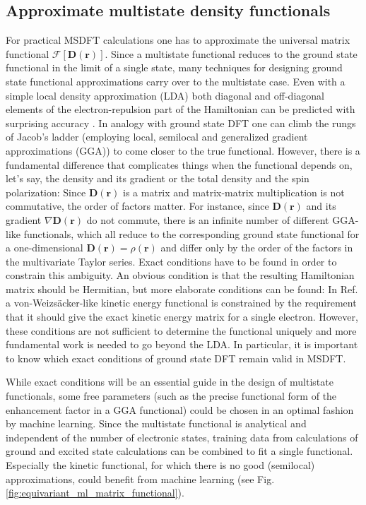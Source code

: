 \documentclass[12pt]{article}
\newcommand\m[1]{\mathbf{#1}}
\renewcommand\vec[1]{\mathbf{#1}}
\begin{document}
\subsection{Approximate multistate density functionals \label{sec:approximation}}
For practical MSDFT calculations one has to approximate the universal matrix functional $\m{\mathcal{F}}[\m{D}(\vec{r})]$.
Since a multistate functional reduces to the ground state functional in the limit of a single state,
many techniques for designing ground state functional approximations carry over to the multistate case.
Even with a simple local density approximation (LDA) both diagonal and off-diagonal elements of the electron-repulsion part of the Hamiltonian
can be predicted with surprising accuracy \cite{Humeniuk2024}. 
In analogy with ground state DFT one can climb the rungs of Jacob's ladder (employing local, semilocal and generalized gradient approximations (GGA))
to come closer to the true functional. However, there is a fundamental difference that complicates things when the functional depends on, let's say, the density and its gradient or the total density and the spin polarization: Since $\m{D}(\vec{r})$ is
a matrix and matrix-matrix multiplication is not commutative, the order of factors matter. For instance, since $\m{D}(\vec{r})$ and its
gradient $\nabla \m{D}(\vec{r})$ do not commute, there is an infinite number of different GGA-like functionals, which all reduce to
the corresponding ground state functional for a one-dimensional $\m{D}(\vec{r}) = \rho(\vec{r})$ and differ only by the order of the factors in the multivariate Taylor series. Exact conditions have to be found
in order to constrain this ambiguity. An obvious condition is that the resulting Hamiltonian matrix should be Hermitian, but more elaborate conditions can be found: In Ref. \cite{Humeniuk2024} a von-Weizs\"{a}cker-like kinetic energy functional is constrained by the requirement that it should give the exact kinetic energy matrix for a single electron. However, these conditions are not sufficient to determine
the functional uniquely and more fundamental work is needed to go beyond the LDA. In particular, it is important to know which exact conditions
of ground state DFT remain valid in MSDFT.

While exact conditions will be an essential guide in the design of multistate functionals,
some free parameters (such as the precise functional form of the enhancement factor in a GGA functional)
could be chosen in an optimal fashion by machine learning.
Since the multistate functional is analytical and independent of the number of electronic states,
training data from calculations of ground and excited state calculations can be combined to fit a single functional.
Especially the kinetic functional, for which there is no good (semilocal) approximations, could benefit from machine learning (see Fig. \ref{fig:equivariant_ml_matrix_functional}).
\end{document}

